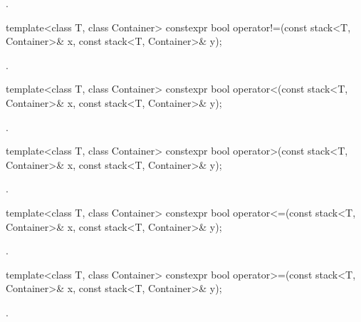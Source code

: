 \begin{itemdescr}
\pnum
\returns
{}.
\end{itemdescr}

%
\begin{itemdecl}
template<class T, class Container>
  constexpr bool operator!=(const stack<T, Container>& x, const stack<T, Container>& y);
\end{itemdecl}

\begin{itemdescr}
\pnum
\returns
{}.
\end{itemdescr}

%
\begin{itemdecl}
template<class T, class Container>
  constexpr bool operator<(const stack<T, Container>& x, const stack<T, Container>& y);
\end{itemdecl}

\begin{itemdescr}
\pnum
\returns
{}.
\end{itemdescr}

%
\begin{itemdecl}
template<class T, class Container>
  constexpr bool operator>(const stack<T, Container>& x, const stack<T, Container>& y);
\end{itemdecl}

\begin{itemdescr}
\pnum
\returns
{}.
\end{itemdescr}

%
\begin{itemdecl}
template<class T, class Container>
  constexpr bool operator<=(const stack<T, Container>& x, const stack<T, Container>& y);
\end{itemdecl}

\begin{itemdescr}
\pnum
\returns
{}.
\end{itemdescr}

%
\begin{itemdecl}
template<class T, class Container>
  constexpr bool operator>=(const stack<T, Container>& x, const stack<T, Container>& y);
\end{itemdecl}

\begin{itemdescr}
\pnum
\returns
{}.
\end{itemdescr}

